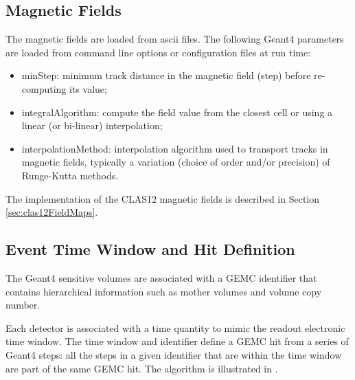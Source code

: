 \subsection{Magnetic Fields}
The magnetic fields are loaded from ascii files. The following Geant4 parameters are loaded from
command line options or configuration files at run time:

\begin{itemize}
	\item minStep: minimum track distance in the magnetic field (step) before re-computing its value;
	\item integralAlgorithm: compute the field value from the closest cell or using a linear (or bi-linear) interpolation;
	\item interpolationMethod: interpolation algorithm used to transport tracks in magnetic fields, typically
		  a variation (choice of order and/or precision) of Runge-Kutta \cite{rungeKutta} methods.
\end{itemize}

The implementation of the CLAS12 magnetic fields is described in Section \ref{sec:clas12FieldMaps}.

\subsection{Event Time Window and Hit Definition}

The Geant4 sensitive volumes are associated with a GEMC identifier that contains hierarchical information such as mother volumes
and volume copy number.

Each detector is associated with a time quantity to mimic the readout electronic time window. The time window and identifier
define a GEMC hit from a series of Geant4 steps: all the steps in a given identifier that are within the time window
are part of the same GEMC hit. The algorithm is illustrated in .

